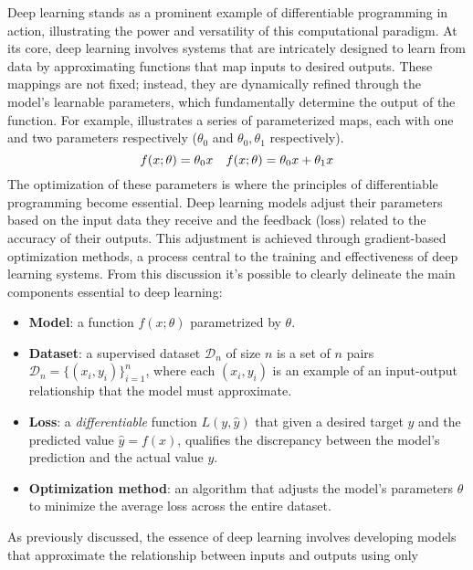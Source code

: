 Deep learning  stands as a prominent
example of differentiable programming in action, illustrating the power and
versatility of this computational paradigm. At its core, deep learning involves
systems that are intricately designed to learn from data by approximating
functions that map inputs to desired outputs. These mappings are not fixed;
instead, they are dynamically refined through the model's learnable parameters,
which fundamentally determine the output of the function.
For example,  illustrates a series of parameterized maps, each with
one and two parameters respectively ($\theta_0$ and $\theta_0, \theta_1$
respectively).
\begin{equation}
\labeq{2_1}
f(x; \theta)=\theta_0 x \quad f(x; \theta) = \theta_0 x + \theta_1 x
\end{equation}
The optimization of these parameters is where the principles of differentiable
programming become essential. Deep learning models adjust their parameters
 based on the input data they receive and
the feedback (loss) related to the accuracy of their outputs.
This adjustment is achieved through gradient-based optimization methods, a
process central to the training and effectiveness of deep learning systems.
From this discussion it's possible to clearly delineate the main components
essential to deep learning:
\begin{itemize}
    \item \textbf{Model}: a function $f(x; \theta)$ parametrized by $\theta$.
    \item \textbf{Dataset}: a supervised dataset $\mathcal{D}_n$ of size $n$ is a
    set of $n$ pairs $\mathcal{D}_n = \{(x_i, y_i)\}^n_{i=1}$, where each $(x_i, y_i)$
    is an example of an input-output relationship that the model must approximate.
    \item \textbf{Loss}: a \emph{differentiable} function $L(y, \hat{y})$ that
    given a desired target $y$ and the predicted value $\hat{y}=f(x)$,
    qualifies the discrepancy between the model's prediction and the
    actual value $y$.
    \item \textbf{Optimization method}: an algorithm that adjusts the model’s
    parameters $\theta$ to minimize the average loss across the entire
    dataset.
\end{itemize}
As previously discussed, the essence of deep learning involves developing
models that approximate the relationship between inputs and outputs using only

